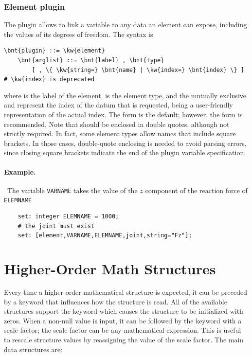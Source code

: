 \subsubsection{Element plugin}
The  plugin allows to link a variable to any data an element
can expose, including the values of its degrees of freedom.
The syntax is
\begin{Verbatim}[commandchars=\\\{\}]
    \bnt{plugin} ::= \kw{element}
    \bnt{arglist} ::= \bnt{label} , \bnt{type}
        [ , \{ \kw{string=} \bnt{name} | \kw{index=} \bnt{index} \} ] # \kw{index} is deprecated
\end{Verbatim}
where
 is the label of the element,
 is the element type,
and the mutually exclusive  and  represent the index
of the datum that is requested,  being a user-friendly
representation of the actual index.
The  form is the default; however, the  form is recommended.
Note that  should be enclosed in double quotes,
although not strictly required.
In fact, some element types allow names that include square brackets.
In those cases, double-quote enclosing is needed to avoid parsing errors,
since closing square brackets indicate the end
of the plugin variable specification.

\paragraph{Example.} \
The variable \texttt{VARNAME} takes the value of the $z$ component 
of the reaction force of \kw{joint} \texttt{ELEMNAME}
\begin{verbatim}
    set: integer ELEMNAME = 1000;
    # the joint must exist
    set: [element,VARNAME,ELEMNAME,joint,string="Fz"];
\end{verbatim}



\section{Higher-Order Math Structures}
Every time a higher-order mathematical structure is expected, it can be
preceded by a keyword that influences how the structure is read.
All of the available structures support the keyword \kw{null}
which causes the structure to be initialized with zeros.
When a non-null value is input, it can be followed by the keyword
\kw{scale} with a scale factor; the scale factor can be any
mathematical expression.
This is useful to rescale structure values by reassigning the value 
of the scale factor.
The main data structures are:
